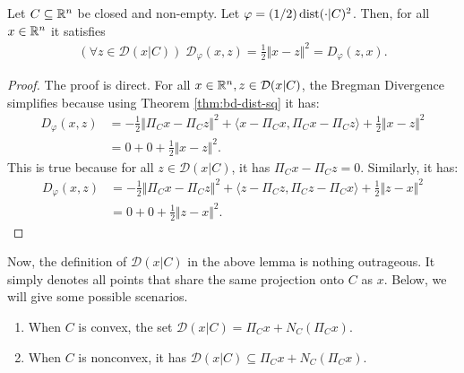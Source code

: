 \documentclass[12pt]{article}
\begin{document}
    \begin{lemma}\label{lemma:conds-dsbd-like-scnvx}
        Let $C \subseteq \mathbb R^n$ be closed and non-empty. 
        Let $\varphi = (1/2)\operatorname{dist}(\cdot | C)^2$.
        Then, for all $x \in \mathbb R^n$ it satisfies
        \begin{align*}
            (\forall z \in \mathcal D(x | C))\; \mathcal D_\varphi(x, z) = \frac{1}{2}\Vert x - z\Vert^2 = D_\varphi(z, x). 
        \end{align*}
    \end{lemma}
    \begin{proof}
        The proof is direct. 
        For all $x \in \mathbb R^n, z \in \mathcal D(x | C)$, the Bregman Divergence simplifies because using Theorem \ref{thm:bd-dist-sq} it has: 
        \begin{align*}
            D_\varphi (x, z) &= 
            - \frac{1}{2}\Vert \Pi_C x - \Pi_C z\Vert^2 
            + \langle x - \Pi_C x, \Pi_C x - \Pi_C z\rangle 
            + \frac{1}{2}\Vert x - z\Vert^2
            \\
            &= 0 + 0 + \frac{1}{2}\Vert x - z\Vert^2. 
        \end{align*}
        This is true because for all $z \in \mathcal D(x | C)$, it has $\Pi_C x - \Pi_C z = 0$. 
        Similarly, it has: 
        \begin{align*}
            D_\varphi(x, z) &= 
            - \frac{1}{2}\Vert \Pi_C x - \Pi_C z\Vert^2 
            + \langle z - \Pi_C z, \Pi_C z - \Pi_C x\rangle
            + \frac{1}{2}\Vert z - x\Vert^2
            \\
            &= 0 + 0 + \frac{1}{2}\Vert z - x\Vert^2. 
        \end{align*}
    \end{proof}
    \par
    Now, the definition of $\mathcal D(x | C)$ in the above lemma is nothing outrageous. 
    It simply denotes all points that share the same projection onto $C$ as $x$. 
    Below, we will give some possible scenarios. 
    \begin{enumerate}
        \item When $C$ is convex, the set $\mathcal D(x | C) = \Pi_C x + N_C(\Pi_C x)$. 
        \item When $C$ is nonconvex, it has $\mathcal D(x | C) \subseteq \Pi_C x + N_C(\Pi_C x)$. 
    \end{enumerate}
\end{document}
